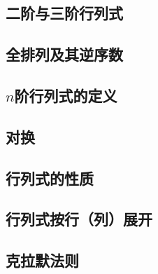 \subsection{二阶与三阶行列式}

\subsection{全排列及其逆序数}

\subsection{$n$阶行列式的定义}

\subsection{对换}

\subsection{行列式的性质}

\subsection{行列式按行（列）展开}

\subsection{克拉默法则}
